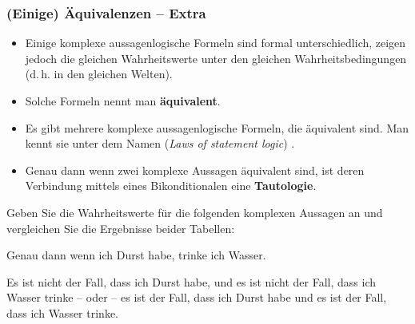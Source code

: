 \begin{frame}
\frametitle{(Einige) Äquivalenzen -- Extra}

\begin{itemize}
	\item Einige komplexe aussagenlogische Formeln sind formal unterschiedlich, zeigen jedoch die gleichen Wahrheitswerte unter den gleichen Wahrheitsbedingungen (d.\,h. in den gleichen Welten). 

	\item Solche Formeln nennt man \textbf{äquivalent}. 
	
	\item Es gibt mehrere komplexe aussagenlogische Formeln, die äquivalent sind. Man kennt sie unter dem Namen  (\textit{Laws of statement logic})  \citep[vgl.][]{Partee&Co93a}.
	
	\item Genau dann wenn zwei komplexe Aussagen äquivalent sind, ist deren Verbindung mittels eines Bikonditionalen eine \textbf{Tautologie}.

\end{itemize}


\end{frame}


\begin{frame}

Geben Sie die Wahrheitswerte für die folgenden komplexen Aussagen an und vergleichen Sie die Ergebnisse beider Tabellen:

\ea\label{ex:Equi1} Genau dann wenn ich Durst habe, trinke ich Wasser.

\ex\label{ex:Equi2} Es ist nicht der Fall, dass ich Durst habe, und es ist nicht der Fall, dass ich Wasser trinke -- oder -- es ist der Fall, dass ich Durst habe und es ist der Fall, dass ich Wasser trinke.
\z 

\end{frame}


